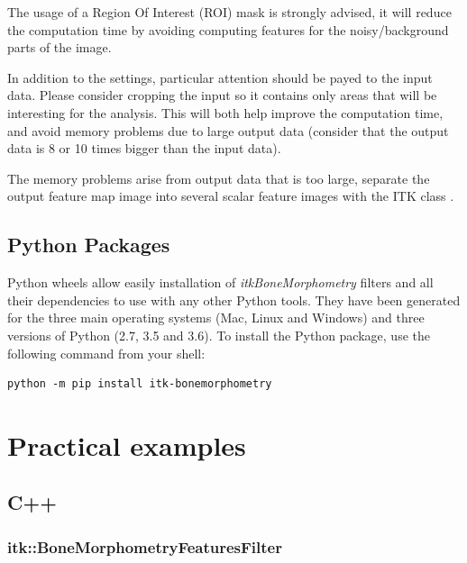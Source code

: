 \documentclass{InsightArticle}
\begin{document}
The usage of a Region Of Interest (ROI) mask is strongly advised, it will reduce the computation time by avoiding computing features for the noisy/background parts of the image.

In addition to the settings, particular attention should be payed to the input data. Please consider cropping the input so it contains only areas that will be interesting for the analysis. This will both help improve the computation time, and avoid memory problems due to large output data (consider that the output data is 8 or 10 times bigger than the input data).

The memory problems arise from output data that is too large, separate the output feature map image into several scalar feature images with the ITK class .

\subsection{Python Packages}
\label{sec:PythonWheels}

Python wheels allow easily installation of \textit{itkBoneMorphometry} filters and all their dependencies to use with any other Python tools. They have been generated for the three main operating systems (Mac, Linux and Windows) and three versions of Python (2.7, 3.5 and 3.6). To install the Python package, use the following command from your shell:

\begin{verbatim}
python -m pip install itk-bonemorphometry
\end{verbatim}
\normalsize

\newpage
\section{Practical examples}
\label{sec:examples}

\subsection{C++}
\label{sec:C++Ex}

\subsubsection{itk::BoneMorphometryFeaturesFilter}
\end{document}
